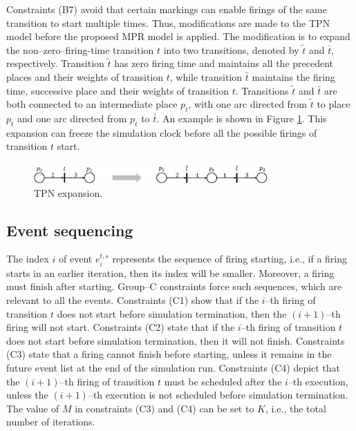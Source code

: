 \documentclass[suppldata]{interact}
\theoremstyle{plain}
\theoremstyle{definition}
\theoremstyle{remark}
\begin{document}
Constraints (B7) avoid that certain markings can enable firings of the same transition to start multiple times. Thus, modifications are made to the TPN model before the proposed MPR model is applied. The modification is to expand the non--zero--firing-time transition $t$ into two transitions, denoted by $\tilde{t}$ and $\bar{t}$, respectively. Transition $\tilde{t}$ has zero firing time and maintains all the precedent places and their weights of transition $t$, while transition $\bar{t}$ maintains the firing time, successive place and their weights of transition $t$. Transitions $\tilde{t}$ and $\bar{t}$ are both connected to an intermediate place $p_t$, %
with one arc %
directed from $\tilde{t}$ to place $p_t$ and one arc %
directed from $p_t$ to $\bar{t}$. An example is shown in Figure \ref{fig:tpn_expansion}. This expansion can freeze the simulation clock before all the possible firings of transition $t$ start.

\begin{figure}[h]
	\centering
	\includegraphics[width=0.8\textwidth]{Figures/TPN_expansion.png}
	\caption{TPN expansion.}
	\label{fig:tpn_expansion}
\end{figure}


\subsection{Event sequencing}
The index $i$ of event $e^{t,s}_i$ represents the sequence of firing starting, i.e., if a firing starts in an earlier iteration, then its index will be smaller. Moreover, a firing must finish after starting. Group--C constraints force such sequences, which are relevant to all the events. Constraints (C1) show that if the $i$--th firing of transition $t$ does not start before simulation termination, then the $(i+1)$--th firing will not start. Constraints (C2) state that if the $i$--th firing of transition $t$ does not start before simulation termination, then it will not finish. Constraints (C3) state that a firing cannot finish before starting, unless it remains in the future event list at the end of the simulation run. Constraints (C4) depict that the $(i+1)$--th firing of transition $t$ must be scheduled after the $i$--th execution, unless the $(i+1)$--th execution is not scheduled before simulation termination. The value of $M$ in constraints (C3) and (C4) can be set to $K$, i.e., the total number of iterations. 
\end{document}
